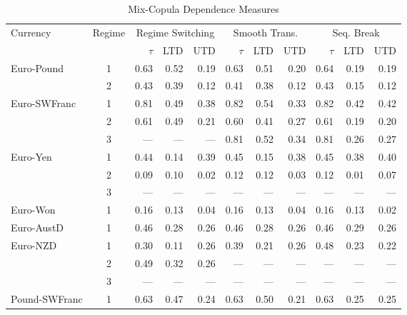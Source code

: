 \documentclass[12pt]{article}
\begin{document}
\begin{table}
\caption{Mix-Copula Dependence Measures}
\begin{threeparttable}
	\begin{tabular}[c]{l c r r r | r r r | r r r}
\hline \hline
\noalign{\smallskip}
Currency & Regime & \multicolumn{3}{c}{Regime Switching} & \multicolumn{3}{c}{Smooth Trans.} & \multicolumn{3}{c}{Seq. Break} \\
\noalign{\smallskip}
\hline
\noalign{\smallskip}
 & & $\tau$ & LTD & UTD & $\tau$ & LTD & UTD & $\tau$ & LTD & UTD \\
 \noalign{\smallskip}
\hline
\noalign{\smallskip}
Euro-Pound & 1 & 0.63  & 0.52  & 0.19  & 0.63  & 0.51  & 0.20  & 0.64  & 0.19  & 0.19  \\
		   & 2 & 0.43  & 0.39  & 0.12  & 0.41  & 0.38  & 0.12  & 0.43  & 0.15  & 0.12  \\
\noalign{\smallskip} \noalign{\smallskip}
Euro-SWFranc & 1 & 0.81  & 0.49  & 0.38  & 0.82  & 0.54  & 0.33  & 0.82  & 0.42  & 0.42  \\
		     & 2 & 0.61  & 0.49  & 0.21  & 0.60  & 0.41  & 0.27  & 0.61  & 0.19  & 0.20  \\
		     & 3 & ---  & ---  & ---  & 0.81  & 0.52  & 0.34  & 0.81  & 0.26  & 0.27  \\
\noalign{\smallskip} \noalign{\smallskip}
Euro-Yen & 1 & 0.44  & 0.14  & 0.39  & 0.45  & 0.15  & 0.38  & 0.45  & 0.38  & 0.40  \\
		 & 2 & 0.09  & 0.10  & 0.02  & 0.12  & 0.12  & 0.03  & 0.12  & 0.01  & 0.07  \\
		 & 3 & ---  & ---  & ---  & ---  & ---  & ---  & ---  & ---  & ---  \\
\noalign{\smallskip} \noalign{\smallskip}
Euro-Won & 1 & 0.16  & 0.13  & 0.04  & 0.16  & 0.13  & 0.04  & 0.16  & 0.13  & 0.02  \\
\noalign{\smallskip} \noalign{\smallskip}
Euro-AustD & 1 & 0.46  & 0.28  & 0.26  & 0.46  & 0.28  & 0.26  & 0.46  & 0.29  & 0.26  \\
\noalign{\smallskip} \noalign{\smallskip}
Euro-NZD & 1 & 0.30  & 0.11  & 0.26  & 0.39  & 0.21  & 0.26  & 0.48  & 0.23  & 0.22  \\
		 & 2 & 0.49  & 0.32  & 0.26  & ---  & ---  & ---  & ---  & ---  & ---  \\
		 & 3 & ---  & ---  & ---  & ---  & ---  & ---  & ---  & ---  & ---  \\
\noalign{\smallskip}
\hline
\noalign{\smallskip}
Pound-SWFranc & 1 & 0.63  & 0.47  & 0.24  & 0.63  & 0.50  & 0.21  & 0.63  & 0.25  & 0.25  \\

\end{tabular}
\end{threeparttable}
\end{table}
\end{document}
